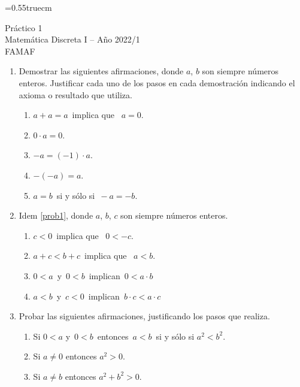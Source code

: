 \documentclass[a4paper,12pt,twoside,spanish,reqno]{amsbook}
\numberwithin{equation}{section}
\begin{document}
    \baselineskip=0.55truecm %
    

{\bf \begin{center}\large  Práctico 1 \\ Matemática Discreta I -- Año 2022/1 \\ FAMAF \end{center}}


\begin{enumerate}
\item\label{prob1} Demostrar las siguientes afirmaciones, donde $a$, $b$ son siempre números \linebreak enteros. Justificar cada uno de los pasos en cada demostración indicando el axioma o resultado que utiliza.
\begin{enumerate}
	\item $a+a=a$\, implica que \,  $a=0$.
	\item $0\cdot a = 0$.
	\item $-a = (-1)\cdot a$.
    \item  $-(-a) = a$.
    \item  $a=b\,$ si y sólo si $\,-a=-b$.
\end{enumerate}




\item Idem \ref{prob1}, donde $a$, $b$, $c$ son siempre números enteros.

\begin{enumerate}
	\item $c<0$\, implica que \, $0 < -c$.
	\item $a+c <b+c$\, implica que \, $a<b$.
    \item $0<a\,$ y $\,0<b\,$ implican $\,0<a\cdot b$
    \item $a<b\,$ y $\,c<0$\, implican $\,b\cdot c<a\cdot c$
\end{enumerate}



\item  Probar las siguientes afirmaciones, justificando los pasos que realiza.
\begin{enumerate}
  \item Si $0 < a$  y $\,0<b\,$ entonces $\,a<b\,$ si y sólo si $a^2<b^2$.
  \item Si $a\neq 0$  entonces $a^2>0$.
  \item Si $a\neq b$  entonces $a^2+b^2>0$.
\end{enumerate}



\end{enumerate}
\end{document}
